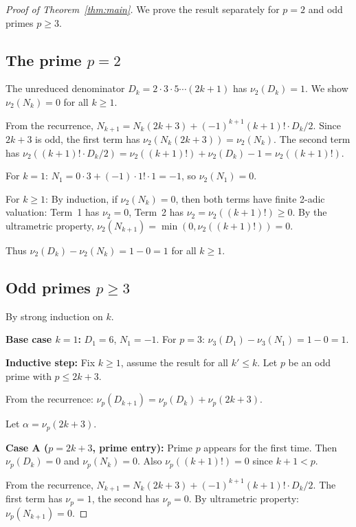 \documentclass[11pt]{article}
\theoremstyle{definition}
\theoremstyle{remark}
\begin{document}
\begin{proof}[Proof of Theorem~\ref{thm:main}]
We prove the result separately for $p = 2$ and odd primes $p \geq 3$.

\subsection*{The prime $p = 2$}

The unreduced denominator $D_k = 2 \cdot 3 \cdot 5 \cdots (2k+1)$ has $\nu_2(D_k) = 1$.
We show $\nu_2(N_k) = 0$ for all $k \geq 1$.

From the recurrence, $N_{k+1} = N_k(2k+3) + (-1)^{k+1}(k+1)! \cdot D_k/2$.
Since $2k+3$ is odd, the first term has $\nu_2(N_k(2k+3)) = \nu_2(N_k)$.
The second term has $\nu_2((k+1)! \cdot D_k/2) = \nu_2((k+1)!) + \nu_2(D_k) - 1 = \nu_2((k+1)!)$.

For $k = 1$: $N_1 = 0 \cdot 3 + (-1) \cdot 1! \cdot 1 = -1$, so $\nu_2(N_1) = 0$.

For $k \geq 1$: By induction, if $\nu_2(N_k) = 0$, then both terms have finite
2-adic valuation: Term~1 has $\nu_2 = 0$, Term~2 has $\nu_2 = \nu_2((k+1)!) \geq 0$.
By the ultrametric property, $\nu_2(N_{k+1}) = \min(0, \nu_2((k+1)!)) = 0$.

Thus $\nu_2(D_k) - \nu_2(N_k) = 1 - 0 = 1$ for all $k \geq 1$.

\subsection*{Odd primes $p \geq 3$}

By strong induction on $k$.

\textbf{Base case $k = 1$:} $D_1 = 6$, $N_1 = -1$.
For $p = 3$: $\nu_3(D_1) - \nu_3(N_1) = 1 - 0 = 1$. \checkmark

\textbf{Inductive step:} Fix $k \geq 1$, assume the result for all $k' \leq k$.
Let $p$ be an odd prime with $p \leq 2k+3$.

From the recurrence: $\nu_p(D_{k+1}) = \nu_p(D_k) + \nu_p(2k+3)$.

Let $\alpha = \nu_p(2k+3)$.

\textbf{Case A ($p = 2k+3$, prime entry):}
Prime $p$ appears for the first time. Then $\nu_p(D_k) = 0$ and $\nu_p(N_k) = 0$.
Also $\nu_p((k+1)!) = 0$ since $k+1 < p$.

From the recurrence, $N_{k+1} = N_k(2k+3) + (-1)^{k+1}(k+1)! \cdot D_k/2$.
The first term has $\nu_p = 1$, the second has $\nu_p = 0$.
By ultrametric property: $\nu_p(N_{k+1}) = 0$.


\end{proof}
\end{document}
